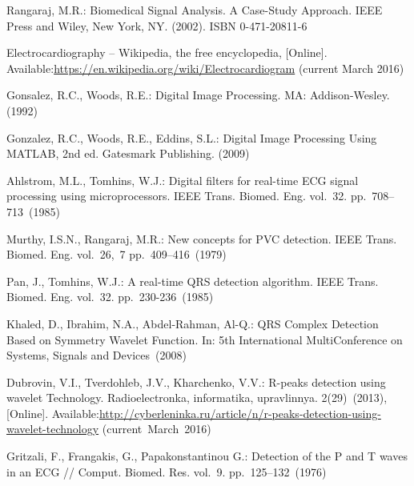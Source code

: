 \documentclass[runningheads]{AIIT}
\begin{document}
%
%
 \begin{thebibliography}{99}

  Rangaraj, M.R.: Biomedical Signal Analysis. A Case-Study Approach. IEEE Press and Wiley, New York, NY. (2002). ISBN 0-471-20811-6

  Electrocardiography -- Wikipedia, the free encyclopedia, [Online].  Available:\url{https://en.wikipedia.org/wiki/Electrocardiogram} (current March 2016)

  Gonsalez, R.C., Woods, R.E.: Digital Image Processing. MA: Addison-Wesley. (1992)

  Gonzalez, R.C., Woods, R.E., Eddins, S.L.: Digital Image Processing Using MATLAB, 2nd ed. Gatesmark Publishing. (2009)

  Ahlstrom, M.L., Tomhins, W.J.: Digital filters for real-time ECG signal processing using microprocessors. IEEE Trans. Biomed. Eng. vol.~32. pp.~708--713~(1985)

  Murthy, I.S.N., Rangaraj, M.R.: New concepts for PVC detection. IEEE Trans. Biomed. Eng. vol.~26,~7 pp.~409--416~(1979)

  Pan, J., Tomhins, W.J.: A real-time QRS detection algorithm. IEEE Trans. Biomed. Eng. vol.~32. pp.~230-236~(1985)

  Khaled, D., Ibrahim, N.A., Abdel-Rahman, Al-Q.: QRS Complex Detection Based on Symmetry Wavelet Function. In: 5th International MultiConference on Systems, Signals and Devices~(2008)

  Dubrovin, V.I., Tverdohleb, J.V., Kharchenko, V.V.: R-peaks detection using wavelet Technology. Radioelectronka, informatika, upravlinnya. 2(29)~(2013), [Online].  Available:\url{http://cyberleninka.ru/article/n/r-peaks-detection-using-wavelet-technology} (current~March~2016)

  Gritzali, F., Frangakis, G., Papakonstantinou G.: Detection of the P and T waves in an ECG // Comput. Biomed. Res. vol.~9. pp.~125--132~(1976)


 \end{thebibliography}


%
%

\end{document}
